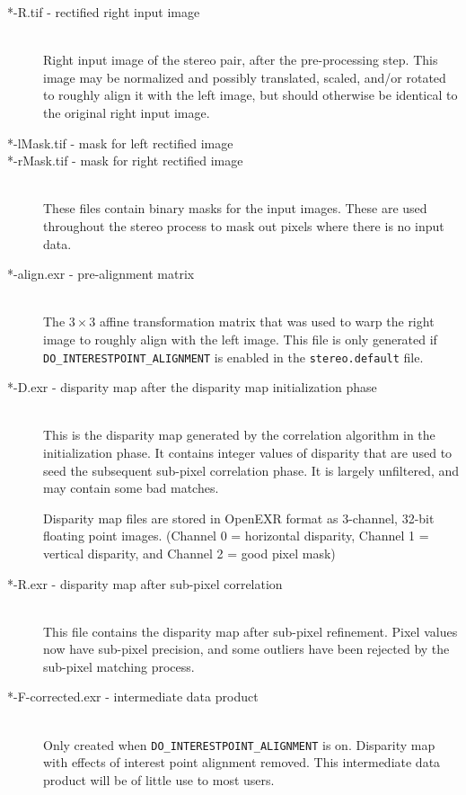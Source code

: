 \begin{description}
\item[*-R.tif - \textnormal{rectified right input image}] \hfill \\
  Right input image of the stereo pair, after the pre-processing
  step.  This image may be normalized and possibly
    translated, scaled, and/or rotated to roughly align it with the left
    image, but should otherwise be identical to the original right
  input image.

\item[*-lMask.tif \textnormal{- mask for left rectified image}]
\item[*-rMask.tif \textnormal{- mask for right rectified image}] \hfill \\
  These files contain binary masks for the input images.  These are
  used throughout the stereo process to mask out pixels where there is
  no input data.

\item[*-align.exr \textnormal{- pre-alignment matrix}] \hfill \\
  The $3 \times 3$ affine transformation matrix that was used to warp the right
  image to roughly align with the left image.  This file is only
  generated if \texttt{DO\_INTERESTPOINT\_ALIGNMENT} is enabled in the
  {\tt stereo.default} file.

\item[*-D.exr \textnormal{- disparity map after the disparity map initialization phase}] \hfill \\
  This is the disparity map generated by the correlation algorithm in
  the initialization phase.  It contains integer values of disparity
  that are used to seed the subsequent sub-pixel correlation phase.
  It is largely unfiltered, and may contain some bad matches.
  
  Disparity map files are stored in OpenEXR format as 3-channel,
  32-bit floating point images.  (Channel 0 = horizontal disparity,
  Channel 1 = vertical disparity, and Channel 2 = good pixel mask)

\item[*-R.exr - \textnormal{disparity map after sub-pixel correlation}] \hfill \\
  This file contains the disparity map after sub-pixel refinement.
  Pixel values now have sub-pixel precision, and some outliers have
  been rejected by the sub-pixel matching process.

\item[*-F-corrected.exr \textnormal{- intermediate data product}] \hfill \\
  Only created when \texttt{DO\_INTERESTPOINT\_ALIGNMENT} is on.
  Disparity map with effects of interest point alignment removed.
  This intermediate data product will be of little use to most users.


\end{description}
